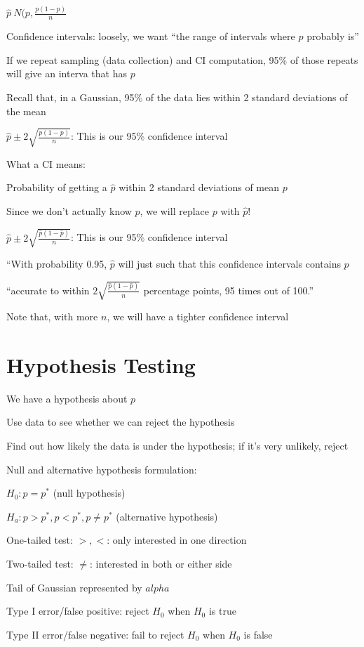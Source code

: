 \documentclass[twoside]{article}
\begin{document}
$\hat{p} ~ N(p, \frac{p(1-p)}{n}$

Confidence intervals: loosely, we want ``the range of intervals where $p$ probably is''

If we repeat sampling (data collection) and CI computation, 95\% of those repeats will give an interva that has $p$

Recall that, in a Gaussian, 95\% of the data lies within 2 standard deviations of the mean

$\hat{p} \pm 2 \sqrt{\frac{p(1-p)}{n}}$: This is our 95\% confidence interval

What a CI means: 

Probability of getting a $\hat{p}$ within 2 standard deviations of mean $p$

Since we don't actually know $p$, we will replace $p$ with $\hat{p}$!

$\hat{p} \pm 2 \sqrt{\frac{\hat{p}(1-\hat{p})}{n}}$: This is our 95\% confidence interval

``With probability 0.95, $\hat{p}$ will just such that this confidence intervals contains $p$

``accurate to within  $2 \sqrt{\frac{\hat{p}(1-\hat{p})}{n}}$ percentage points, 95 times out of 100.''

Note that, with more $n$, we will have a tighter confidence interval

\section{Hypothesis Testing}

We have a hypothesis about $p$

Use data to see whether we can reject the hypothesis


Find out how likely the data is under the hypothesis; if it's very unlikely, reject

Null and alternative hypothesis formulation:

$H_0: p = p^*$ (null hypothesis)

$H_a: p > p^*, p < p^*, p \neq p^*$ (alternative hypothesis)

One-tailed test: $>, <$: only interested in one direction

Two-tailed test: $\neq$: interested in both or either side

Tail of Gaussian represented by $alpha$

Type I error/false positive: reject $H_0$ when $H_0$ is true

Type II error/false negative: fail to reject $H_0$ when $H_0$ is false
\end{document}
